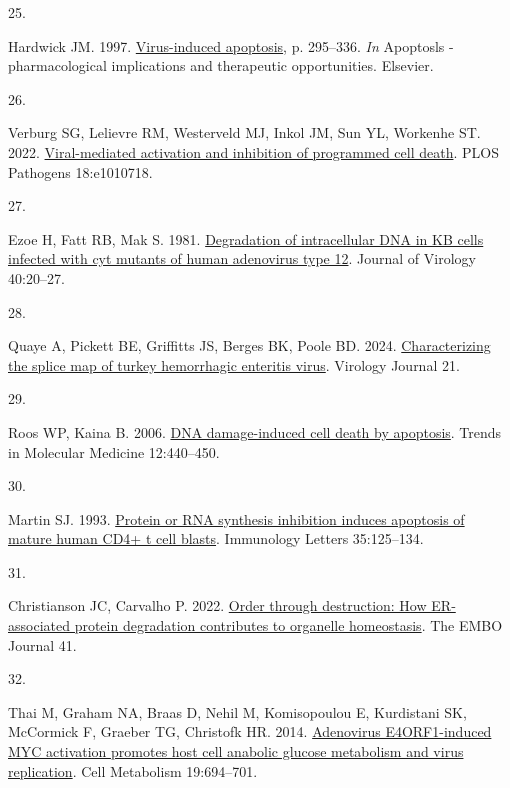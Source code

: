 \documentclass[
]{article}
\newlength{\cslhangindent}
\newlength{\csllabelwidth}
\newenvironment{CSLReferences}[2] %
 {\begin{list}{}{%
  \setlength{\itemindent}{0pt}
  \setlength{\leftmargin}{0pt}
  \setlength{\parsep}{0pt}
  \ifodd #1
   \setlength{\leftmargin}{\cslhangindent}
   \setlength{\itemindent}{-1\cslhangindent}
  \fi
  \setlength{\itemsep}{#2\baselineskip}}}
 {\end{list}}
\newcommand{\CSLLeftMargin}[1]{\parbox[t]{\csllabelwidth}{\strut#1\strut}}
\newcommand{\CSLRightInline}[1]{\parbox[t]{\linewidth - \csllabelwidth}{\strut#1\strut}}
\begin{document}
\begin{CSLReferences}{0}{1}
\CSLLeftMargin{25. }%
\CSLRightInline{Hardwick JM. 1997.
\href{https://doi.org/10.1016/s1054-3589(08)61063-7}{Virus-induced
apoptosis}, p. 295--336. \emph{In} Apoptosls - pharmacological
implications and therapeutic opportunities. Elsevier.}

\CSLLeftMargin{26. }%
\CSLRightInline{Verburg SG, Lelievre RM, Westerveld MJ, Inkol JM, Sun
YL, Workenhe ST. 2022.
\href{https://doi.org/10.1371/journal.ppat.1010718}{Viral-mediated
activation and inhibition of programmed cell death}. PLOS Pathogens
18:e1010718.}

\CSLLeftMargin{27. }%
\CSLRightInline{Ezoe H, Fatt RB, Mak S. 1981.
\href{https://doi.org/10.1128/jvi.40.1.20-27.1981}{Degradation of
intracellular DNA in KB cells infected with cyt mutants of human
adenovirus type 12}. Journal of Virology 40:20--27.}

\CSLLeftMargin{28. }%
\CSLRightInline{Quaye A, Pickett BE, Griffitts JS, Berges BK, Poole BD.
2024. \href{https://doi.org/10.1186/s12985-024-02449-0}{Characterizing
the splice map of turkey hemorrhagic enteritis virus}. Virology Journal
21.}

\CSLLeftMargin{29. }%
\CSLRightInline{Roos WP, Kaina B. 2006.
\href{https://doi.org/10.1016/j.molmed.2006.07.007}{DNA damage-induced
cell death by apoptosis}. Trends in Molecular Medicine 12:440--450.}

\CSLLeftMargin{30. }%
\CSLRightInline{Martin SJ. 1993.
\href{https://doi.org/10.1016/0165-2478(93)90080-l}{Protein or RNA
synthesis inhibition induces apoptosis of mature human CD4+ t cell
blasts}. Immunology Letters 35:125--134.}

\CSLLeftMargin{31. }%
\CSLRightInline{Christianson JC, Carvalho P. 2022.
\href{https://doi.org/10.15252/embj.2021109845}{Order through
destruction: How ER‐associated protein degradation contributes to
organelle homeostasis}. The EMBO Journal 41.}

\CSLLeftMargin{32. }%
\CSLRightInline{Thai M, Graham NA, Braas D, Nehil M, Komisopoulou E,
Kurdistani SK, McCormick F, Graeber TG, Christofk HR. 2014.
\href{https://doi.org/10.1016/j.cmet.2014.03.009}{Adenovirus
E4ORF1-induced MYC activation promotes host cell anabolic glucose
metabolism and virus replication}. Cell Metabolism 19:694--701.}


\end{CSLReferences}
\end{document}
